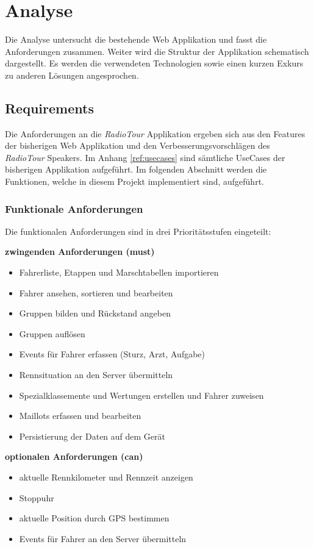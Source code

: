 \chapter{Analyse}
Die Analyse untersucht die bestehende Web Applikation und fasst die Anforderungen zusammen. Weiter wird die Struktur der Applikation schematisch dargestellt. Es werden die verwendeten Technologien sowie einen kurzen Exkurs zu anderen Lösungen angesprochen.

\section{Requirements}
Die Anforderungen an die \textit{RadioTour} Applikation ergeben sich aus den Features der bisherigen Web Applikation und den Verbesserungsvorschlägen des \textit{RadioTour} Speakers. Im Anhang \ref{ref:usecases} sind sämtliche UseCases der bisherigen Applikation aufgeführt. Im folgenden Abschnitt werden die Funktionen, welche in diesem Projekt implementiert sind, aufgeführt.

\subsection{Funktionale Anforderungen}
Die funktionalen Anforderungen sind in drei Prioritätsstufen eingeteilt:

\textbf{zwingenden Anforderungen (must)}
\begin{itemize}
\item Fahrerliste, Etappen und Marschtabellen importieren
\item Fahrer ansehen, sortieren und bearbeiten
\item Gruppen bilden und Rückstand angeben
\item Gruppen auflösen
\item Events für Fahrer erfassen (Sturz, Arzt, Aufgabe)
\item Rennsituation an den Server übermitteln
\item Spezialklassemente und Wertungen erstellen und Fahrer zuweisen
\item Maillots erfassen und bearbeiten
\item Persistierung der Daten auf dem Gerät

\end{itemize}


\textbf{optionalen Anforderungen (can)}
\begin{itemize}
\item aktuelle Rennkilometer und Rennzeit anzeigen
\item Stoppuhr
\item aktuelle Position durch GPS bestimmen
\item Events für Fahrer an den Server übermitteln
\end{itemize}


